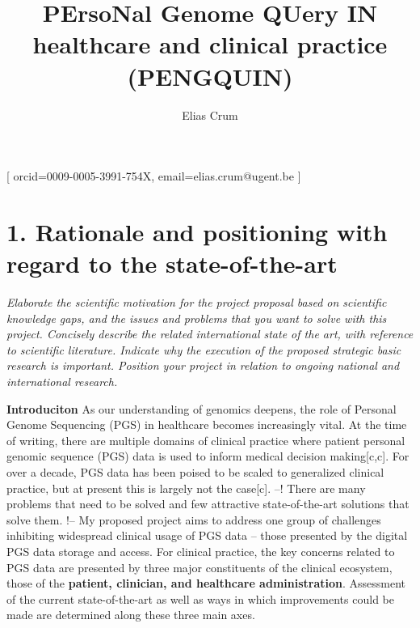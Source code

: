\documentclass{article}
\begin{document}
\title{PErsoNal Genome QUery IN healthcare and clinical practice (PENGQUIN)}
\author[1,2]{Elias Crum}[
orcid=0009-0005-3991-754X,
email=elias.crum@ugent.be
]

\maketitle

\section{1. Rationale and positioning with regard to the state-of-the-art}
\textit{Elaborate the scientific motivation for the project proposal based on scientific knowledge gaps, and the issues and problems that you want to solve with this project. Concisely describe the related international state of the art, with reference to scientific literature. Indicate why the execution of the proposed strategic basic research is important. Position your project in relation to ongoing national and international research.} 



\textbf{Introduciton}
As our understanding of genomics deepens, the role of Personal Genome Sequencing (PGS) in healthcare becomes increasingly vital. 
At the time of writing, there are multiple domains of clinical practice where patient personal genomic sequence (PGS) data is used to inform medical decision making[c,c]. 
For over a decade, PGS data has been poised to be scaled to generalized clinical practice, but at present this is largely not the case[c]. 
--! There are many problems that need to be solved and few attractive state-of-the-art solutions that solve them. !--
My proposed project aims to address one group of challenges inhibiting widespread clinical usage of PGS data -- those presented by the digital PGS data storage and access. 
For clinical practice, the key concerns related to PGS data are presented by three major constituents of the clinical ecosystem, those of the \textbf{patient, clinician, and healthcare administration}. 
Assessment of the current state-of-the-art as well as ways in which improvements could be made are determined along these three main axes.
\end{document}
